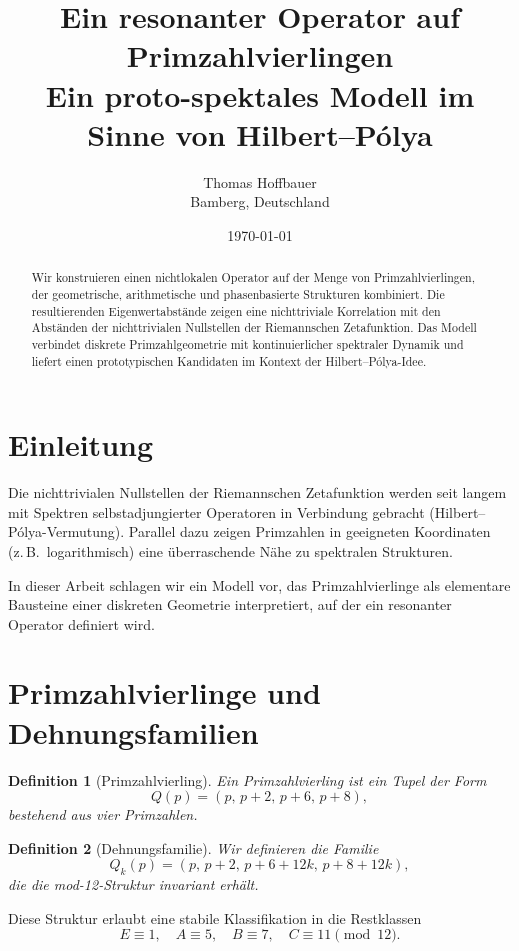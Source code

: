 \documentclass[11pt,a4paper]{article}
\title{Ein resonanter Operator auf Primzahlvierlingen\\
	\large Ein proto-spektales Modell im Sinne von Hilbert--Pólya}
\author{Thomas Hoffbauer\\
	Bamberg, Deutschland}
\date{\today}
\newtheorem{definition}{Definition}[section]
\begin{document}
	
	\maketitle
	
	\begin{abstract}
		Wir konstruieren einen nichtlokalen Operator auf der Menge von Primzahlvierlingen, der geometrische, arithmetische und phasenbasierte Strukturen kombiniert.
		Die resultierenden Eigenwertabstände zeigen eine nichttriviale Korrelation mit den Abständen der nichttrivialen Nullstellen der Riemannschen Zetafunktion.
		Das Modell verbindet diskrete Primzahlgeometrie mit kontinuierlicher spektraler Dynamik und liefert einen prototypischen Kandidaten im Kontext der Hilbert--Pólya-Idee.
	\end{abstract}
	
	\section{Einleitung}
	
	Die nichttrivialen Nullstellen der Riemannschen Zetafunktion werden seit langem mit Spektren selbstadjungierter Operatoren in Verbindung gebracht (Hilbert--Pólya-Vermutung).
	Parallel dazu zeigen Primzahlen in geeigneten Koordinaten (z.\,B.\ logarithmisch) eine überraschende Nähe zu spektralen Strukturen.
	
	In dieser Arbeit schlagen wir ein Modell vor, das Primzahlvierlinge als elementare Bausteine einer diskreten Geometrie interpretiert, auf der ein resonanter Operator definiert wird.
	
	\section{Primzahlvierlinge und Dehnungsfamilien}
	
	\begin{definition}[Primzahlvierling]
		Ein Primzahlvierling ist ein Tupel der Form
		\[
		Q(p) = (p,\, p+2,\, p+6,\, p+8),
		\]
		bestehend aus vier Primzahlen.
	\end{definition}
	
	\begin{definition}[Dehnungsfamilie]
		Wir definieren die Familie
		\[
		Q_k(p) = (p,\, p+2,\, p+6+12k,\, p+8+12k),
		\]
		die die mod-12-Struktur invariant erhält.
	\end{definition}
	
	Diese Struktur erlaubt eine stabile Klassifikation in die Restklassen
	\[
	E \equiv 1,\quad A \equiv 5,\quad B \equiv 7,\quad C \equiv 11 \pmod{12}.
	\]
	
\end{document}

